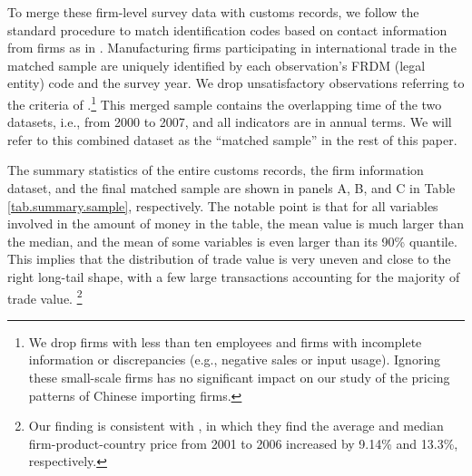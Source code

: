 To merge these firm-level survey data with customs records, we follow the standard procedure to match identification codes based on contact information from firms as in \cite{fan-li-yeaple2015}. Manufacturing firms participating in international trade in the matched sample are uniquely identified by each observation's FRDM (legal entity) code and the survey year. We drop unsatisfactory observations referring to the criteria of \cite{bkl2021}.\footnote{We drop firms with less than ten employees and firms with incomplete information or discrepancies (e.g., negative sales or input usage). Ignoring these small-scale firms has no significant impact on our study of the pricing patterns of Chinese importing firms.} This merged sample contains the overlapping time of the two datasets, i.e., from 2000 to 2007, and all indicators are in annual terms. We will refer to this combined dataset as the ``matched sample'' in the rest of this paper.

The summary statistics of the entire customs records, the firm information dataset, and the final matched sample are shown in panels A, B, and C in Table \ref{tab.summary.sample}, respectively. The notable point is that for all variables involved in the amount of money in the table, the mean value is much larger than the median, and the mean of some variables is even larger than its 90\% quantile. This implies that the distribution of trade value is very uneven and close to the right long-tail shape, with a few large transactions accounting for the majority of trade value. \footnote{Our finding is consistent with \cite{fan-li-yeaple2015}, in which they find the average and median firm-product-country price from 2001 to 2006 increased by 9.14\% and 13.3\%, respectively.}

